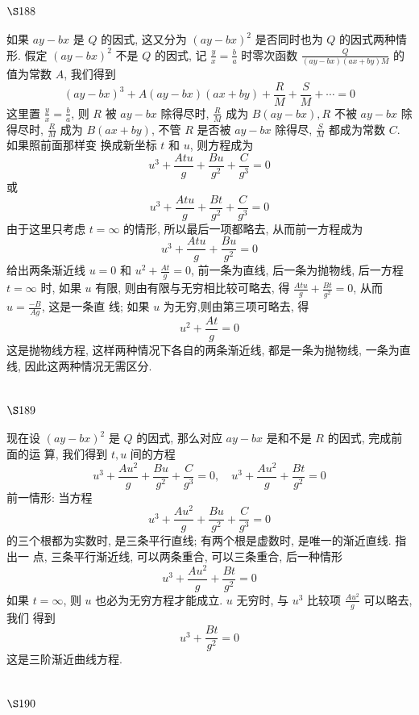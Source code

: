 \section{$\S 188$}

如果 $a y-b x$ 是 $Q$ 的因式, 这又分为 $(a y-b x)^{2}$ 是否同时也为 $Q$ 的因式两种情形. 假定 $(a y-b x)^{2}$ 不是 $Q$ 的因式, 记 $\frac{y}{x}=\frac{b}{a}$ 时零次函数 $\frac{Q}{(a y-b x)(a x+b y) M}$ 的值为常数 $A$, 我们得到
\[
(a y-b x)^{3}+A(a y-b x)(a x+b y)+\frac{R}{M}+\frac{S}{M}+\cdots=0
\]
这里置 $\frac{y}{x}=\frac{b}{a}$, 则 $R$ 被 $a y-b x$ 除得尽时, $\frac{R}{M}$ 成为 $B(a y-b x), R$ 不被 $a y-b x$ 除得尽时, $\frac{R}{M}$ 成为 $B(a x+b y)$, 不管 $R$ 是否被 $a y-b x$ 除得尽, $\frac{S}{M}$ 都成为常数 $C$. 如果照前面那样变 换成新坐标 $t$ 和 $u$, 则方程成为
\[
u^{3}+\frac{A t u}{g}+\frac{B u}{g^{2}}+\frac{C}{g^{3}}=0
\]
或
\[
u^{3}+\frac{A t u}{g}+\frac{B t}{g^{2}}+\frac{C}{g^{3}}=0
\]
由于这里只考虑 $t=\infty$ 的情形, 所以最后一项都略去, 从而前一方程成为
\[
u^{3}+\frac{A t u}{g}+\frac{B u}{g^{2}}=0
\]
给出两条渐近线 $u=0$ 和 $u^{2}+\frac{A t}{g}=0$, 前一条为直线, 后一条为抛物线, 后一方程 $t=\infty$ 时, 如果 $u$ 有限, 则由有限与无穷相比较可略去, 得 $\frac{A t u}{g}+\frac{B t}{g^{2}}=0$, 从而 $u=\frac{-B}{A g}$, 这是一条直 线; 如果 $u$ 为无穷,则由第三项可略去, 得
\[
u^{2}+\frac{A t}{g}=0
\]
这是抛物线方程, 这样两种情况下各自的两条渐近线, 都是一条为抛物线, 一条为直线, 因此这两种情况无需区分.

\section{$\S 189$}

现在设 $(a y-b x)^{2}$ 是 $Q$ 的因式, 那么对应 $a y-b x$ 是和不是 $R$ 的因式, 完成前面的运 算, 我们得到 $t, u$ 间的方程
\[
u^{3}+\frac{A u^{2}}{g}+\frac{B u}{g^{2}}+\frac{C}{g^{3}}=0, \quad u^{3}+\frac{A u^{2}}{g}+\frac{B t}{g^{2}}=0
\]
前一情形: 当方程
\[
u^{3}+\frac{A u^{2}}{g}+\frac{B u}{g^{2}}+\frac{C}{g^{3}}=0
\]
的三个根都为实数时, 是三条平行直线; 有两个根是虚数时, 是唯一的渐近直线. 指出一 点, 三条平行渐近线, 可以两条重合, 可以三条重合, 后一种情形
\[
u^{3}+\frac{A u^{2}}{g}+\frac{B t}{g^{2}}=0
\]
如果 $t=\infty$, 则 $u$ 也必为无穷方程才能成立. $u$ 无穷时, 与 $u^{3}$ 比较项 $\frac{A u^{2}}{g}$ 可以略去, 我们 得到
\[
u^{3}+\frac{B t}{g^{2}}=0
\]
这是三阶渐近曲线方程.

\section{$\S 190$}

